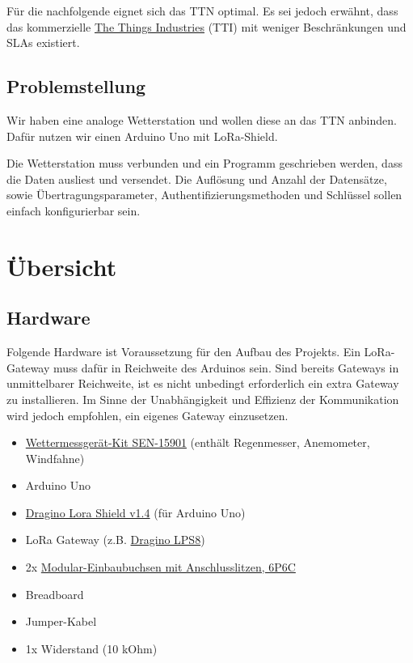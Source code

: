 \documentclass[12pt]{article}
\begin{document}
        Für die nachfolgende \underline{} eignet sich das TTN optimal. Es sei jedoch erwähnt, dass das kommerzielle \href{https://www.thethingsindustries.com/}{The Things Industries} (TTI) mit weniger Beschränkungen und SLAs existiert.
         


    \subsection{Problemstellung} \label{subsec:Problemstellung}
        Wir haben eine analoge Wetterstation und wollen diese an das TTN anbinden.
        Dafür nutzen wir einen Arduino Uno mit LoRa-Shield.

        Die Wetterstation muss verbunden und ein Programm geschrieben werden, dass die Daten ausliest und versendet.
        Die Auflösung und Anzahl der Datensätze, sowie Übertragungsparameter, Authentifizierungsmethoden und Schlüssel
        sollen einfach konfigurierbar sein.



  \section{Übersicht}

    \subsection{Hardware}
    Folgende Hardware ist Voraussetzung für den Aufbau des Projekts.
    Ein LoRa-Gateway muss dafür in Reichweite des Arduinos sein.
    Sind bereits Gateways in unmittelbarer Reichweite, ist es nicht unbedingt erforderlich ein extra Gateway zu installieren.
    Im Sinne der Unabhängigkeit und Effizienz der Kommunikation wird jedoch empfohlen, ein eigenes Gateway einzusetzen.

      \begin{itemize}
        \item \href{https://learn.sparkfun.com/tutorials/weather-meter-hookup-guide#resources-and-going-further}{Wettermessgerät-Kit SEN-15901} (enthält Regenmesser, Anemometer, Windfahne)
        \item Arduino Uno
        \item \href{https://wiki.dragino.com/index.php?title=Lora_Shield}{Dragino Lora Shield v1.4} (für Arduino Uno)
        \item LoRa Gateway (z.B. \href{https://www.dragino.com/products/lora-lorawan-gateway/item/148-lps8.html}{Dragino LPS8})
        \item 2x \href{https://www.pollin.de/p/modular-einbaubuchse-mit-anschlusslitzen-6p6c-541843}{Modular-Einbaubuchsen mit Anschlusslitzen, 6P6C}
        \item Breadboard
        \item Jumper-Kabel
        \item 1x Widerstand (10 kOhm)
      \end{itemize}
\end{document}
